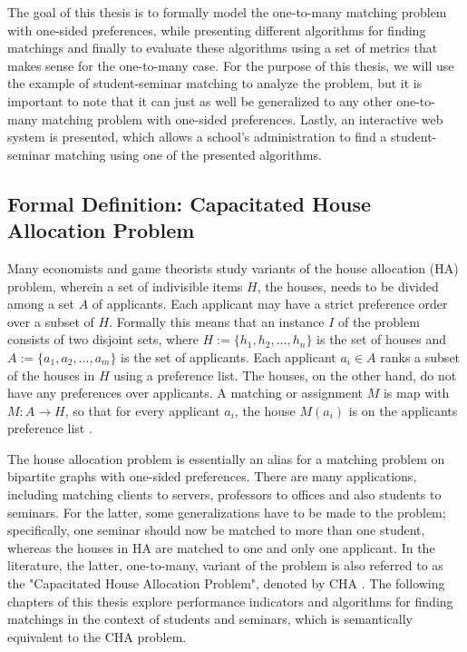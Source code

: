 The goal of this thesis is to formally model the one-to-many matching problem with one-sided preferences, while presenting different algorithms for finding matchings and finally to evaluate these algorithms using a set of metrics that makes sense for the one-to-many case. For the purpose of this thesis, we will use the example of student-seminar matching to analyze the problem, but it is important to note that it can just as well be generalized to any other one-to-many matching problem with one-sided preferences. Lastly, an interactive web system is presented, which allows a school's administration to find a student-seminar matching using one of the presented algorithms. 

\subsection{Formal Definition: Capacitated House Allocation Problem}\label{intro:cha}
Many economists and game theorists \cite{FEKETE2003219} study variants of the house allocation (HA) problem, wherein a set of indivisible items $H$, the houses, needs to be divided among a set $A$ of applicants. Each applicant may have a strict preference order over a subset of $H$. Formally this means that an instance $I$ of the problem consists of two disjoint sets, where $H := \{h_1, h_2, ..., h_n\}$ is the set of houses and $A := \{a_1, a_2, ..., a_m\}$ is the set of applicants. Each applicant $a_i \in A$ ranks a subset of the houses in $H$ using a preference list. The houses, on the other hand, do not have any preferences over applicants. A matching or assignment $M$ is map with $M: A \rightarrow H$, so that for every applicant $a_i$, the house $M(a_i)$ is on the applicants preference list \cite{SngThesis}. 

The house allocation problem is essentially an alias for a matching problem on bipartite graphs with one-sided preferences. There are many applications, including matching clients to servers, professors to offices and also students to seminars. For the latter, some generalizations have to be made to the problem; specifically, one seminar should now be matched to more than one student, whereas the houses in HA are matched to one and only one applicant. In the literature, the latter, one-to-many, variant of the problem is also referred to as the "Capacitated House Allocation Problem", denoted by CHA \cite{algorithmics}. The following chapters of this thesis explore performance indicators and algorithms for finding matchings in the context of students and seminars, which is semantically equivalent to the CHA problem.


